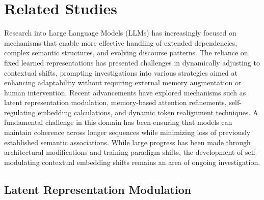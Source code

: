 \section{Related Studies}

Research into Large Language Models (LLMs) has increasingly focused on mechanisms that enable more effective handling of extended dependencies, complex semantic structures, and evolving discourse patterns. The reliance on fixed learned representations has presented challenges in dynamically adjusting to contextual shifts, prompting investigations into various strategies aimed at enhancing adaptability without requiring external memory augmentation or human intervention. Recent advancements have explored mechanisms such as latent representation modulation, memory-based attention refinements, self-regulating embedding calculations, and dynamic token realignment techniques. A fundamental challenge in this domain has been ensuring that models can maintain coherence across longer sequences while minimizing loss of previously established semantic associations. While large progress has been made through architectural modifications and training paradigm shifts, the development of self-modulating contextual embedding shifts remains an area of ongoing investigation.

\subsection{Latent Representation Modulation}

